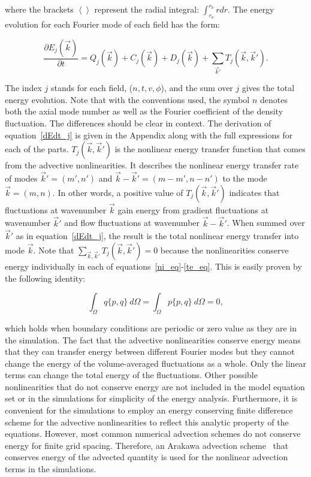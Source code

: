 \documentclass[showpacs,preprintnumbers,amsmath,amssymb,superscriptaddress]{revtex4}
\def\beq{\begin{equation}}
\def\eeq{\end{equation}}
\newcommand{\pdiff}[2]{\frac{\partial#1}{\partial#2}}
\begin{document}
where the brackets $\left< \right>$ represent the radial integral: $\int_{r_a}^{r_b} r dr$. 
The energy evolution for each Fourier mode of each field has the form:

\beq
\label{dEdt_j}
\pdiff{E_{j}(\vec{k})}{t} = Q_{j}(\vec{k}) + C_{j}(\vec{k}) + D_j(\vec{k}) + \sum_{\vec{k}'} T_{j}(\vec{k},\vec{k}').
\eeq

The index $j$ stands for each field, ($n,t,v,\phi$), and the sum over $j$ gives the total energy evolution. 
Note that with the conventions used, the symbol $n$ denotes both the axial mode number as
well as the Fourier coefficient of the density fluctuation. The differences should be clear in context. The derivation of equation~\ref{dEdt_j} 
is given in the Appendix along with the full expressions for each of the parts. $T_{j}(\vec{k},\vec{k}')$ is the nonlinear energy transfer function that comes from the advective
nonlinearities.  It describes the nonlinear energy transfer rate of modes $\vec{k}'=(m',n')$ and $\vec{k}-\vec{k}'=(m-m',n-n')$ to the mode $\vec{k}=(m,n)$. 
In other words, a positive value of $T_{j}(\vec{k},\vec{k}')$ indicates that fluctuations
at wavenumber $\vec{k}$ gain energy from gradient fluctuations at wavenumber $\vec{k}'$ and flow fluctuations at wavenumber $\vec{k}-\vec{k}'$.
When summed over $\vec{k}'$ as in equation~\ref{dEdt_j}, the result is the total
nonlinear energy transfer into mode $\vec{k}$. 
Note that $\sum_{\vec{k},\vec{k}'} T_{j}(\vec{k},\vec{k}') = 0$ because the nonlinearities conserve energy individually in each of equations~\ref{ni_eq}-\ref{te_eq}.
This is easily proven by the following identity:

\beq
\label{poisson_rln}
\int_\Omega q \{p,q\} \ d\Omega = \int_\Omega p \{p,q\} \ d\Omega = 0,
\eeq

which holds when boundary conditions are periodic or zero value as they are in the simulation. 
The fact that the advective nonlinearities conserve energy means that they can transfer energy between different Fourier modes
but they cannot change the energy of the volume-averaged fluctuations
as a whole. Only the linear terms can change the total energy of the fluctuations.
Other possible nonlinearities that do not conserve energy are not
included in the model equation set or in the simulations for simplicity of the energy analysis. 
Furthermore, it is convenient for the simulations to employ an energy conserving finite difference
scheme for the advective nonlinearities to reflect this analytic property of the equations. 
However, most common numerical advection schemes do not conserve energy for finite grid spacing. Therefore, an Arakawa advection scheme~\cite{arakawa1966} that conserves 
energy of the advected quantity is used for the nonlinear advection terms in the simulations.
\end{document}
